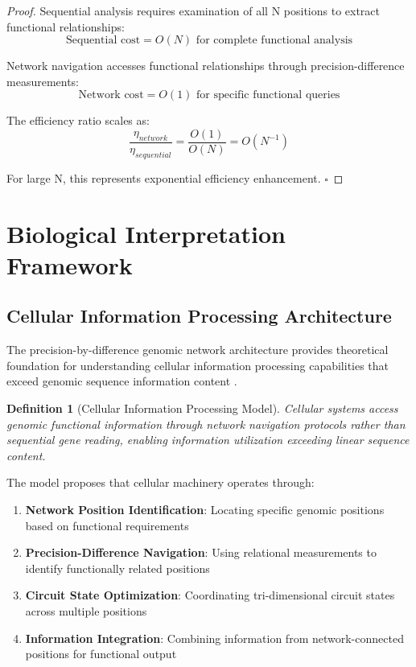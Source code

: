 \documentclass[12pt,a4paper]{article}
\newtheorem{definition}{Definition}
\begin{document}
\begin{proof}
Sequential analysis requires examination of all N positions to extract functional relationships:
\begin{equation}
\text{Sequential cost} = O(N) \text{ for complete functional analysis}
\end{equation}

Network navigation accesses functional relationships through precision-difference measurements:
\begin{equation}
\text{Network cost} = O(1) \text{ for specific functional queries}
\end{equation}

The efficiency ratio scales as:
\begin{equation}
\frac{\eta_{network}}{\eta_{sequential}} = \frac{O(1)}{O(N)} = O(N^{-1})
\end{equation}

For large N, this represents exponential efficiency enhancement. $\square$
\end{proof}

\section{Biological Interpretation Framework}

\subsection{Cellular Information Processing Architecture}

The precision-by-difference genomic network architecture provides theoretical foundation for understanding cellular information processing capabilities that exceed genomic sequence information content \cite{alberts2014molecular}.

\begin{definition}[Cellular Information Processing Model]
Cellular systems access genomic functional information through network navigation protocols rather than sequential gene reading, enabling information utilization exceeding linear sequence content.
\end{definition}

The model proposes that cellular machinery operates through:

\begin{enumerate}
\item \textbf{Network Position Identification}: Locating specific genomic positions based on functional requirements
\item \textbf{Precision-Difference Navigation}: Using relational measurements to identify functionally related positions  
\item \textbf{Circuit State Optimization}: Coordinating tri-dimensional circuit states across multiple positions
\item \textbf{Information Integration}: Combining information from network-connected positions for functional output
\end{enumerate}
\end{document}
